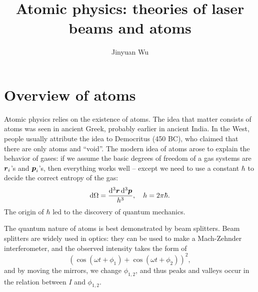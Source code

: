 \documentclass[hyperref, a4paper]{article}
\title{Atomic physics: theories of laser beams and atoms}
\author{Jinyuan Wu}
\begin{document}
\maketitle

\section{Overview of atoms}

Atomic physics relies on the existence of atoms.
The idea that matter consists of atoms 
was seen in ancient Greek,
probably earlier in ancient India.
In the West, people usually attribute the idea to Democritus (450 BC),
who claimed that there are only atoms and ``void''.
The modern idea of atoms arose to explain the behavior of gases:
if we assume the basic degrees of freedom of a gas systems are 
$\vb*{r}_i$'s and $\vb*{p}_i$'s,
then everything works well -- 
except we need to use a constant $\hbar$ to decide the correct entropy of the gas:
\begin{equation}
    \dd{\Omega} = \frac{\dd[3]{\vb*{r}} \dd[3]{\vb*{p}}}{h^3}, \quad h = 2\pi \hbar.
\end{equation}
The origin of $\hbar$ led to the discovery of quantum mechanics.

The quantum nature of atoms is best demonstrated by beam splitters.
Beam splitters are widely used in optics:
they can be used to make a Mach-Zehnder interferometer, 
and the observed intensity takes the form of 
\[
    (\cos(\omega t + \phi_1) + \cos(\omega t + \phi_2))^2,
\]
and by moving the mirrors, 
we change $\phi_{1, 2}$,
and thus peaks and valleys occur in the relation between $I$ and $\phi_{1, 2}$.
\end{document}

